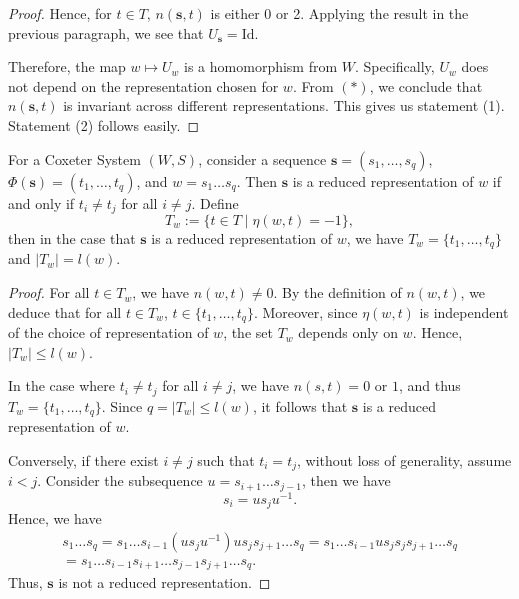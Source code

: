 \documentclass[../main.tex]{subfiles}
\begin{document}
\begin{lemma}
\begin{proof}
        Hence, for $t \in T$, $n(\mathbf{s}, t)$ is either 0 or 2. Applying the result in the previous paragraph, we see that $U_{\mathbf{s}} = \text{Id}$.

        Therefore, the map $w \mapsto U_w$ is a homomorphism from $W$. Specifically, $U_w$ does not depend on the representation chosen for $w$. From $(*)$, we conclude that $n(\mathbf{s}, t)$ is invariant across different representations. This gives us statement (1). Statement (2) follows easily.
    \end{proof}
\end{lemma}

\begin{theorem}
For a Coxeter System $(W,S)$, consider a sequence $\mathbf{s} = (s_1, \dots, s_q)$, $\Phi(\mathbf{s}) = (t_1, \dots, t_q)$, and $w = s_1 \dots s_q$. Then $\mathbf{s}$ is a reduced representation of $w$ if and only if $t_i \neq t_j$ for all $i \neq j$. Define
\[
T_w := \{ t \in T \mid \eta(w, t) = -1 \},
\]
then in the case that $\mathbf{s}$ is a reduced representation of $w$, we have $T_w = \{ t_1, \dots, t_q \}$ and $|T_w| = l(w)$.

    \begin{proof}
        For all $t \in T_w$, we have $n(w, t) \neq 0$. By the definition of $n(w, t)$, we deduce that for all $t \in T_w$, $t \in \{ t_1, \dots, t_q \}$. Moreover, since $\eta(w, t)$ is independent of the choice of representation of $w$, the set $T_w$ depends only on $w$. Hence, $|T_w| \leq l(w)$.

        In the case where $t_i \neq t_j$ for all $i \neq j$, we have $n(s, t) = 0$ or $1$, and thus $T_w = \{ t_1, \dots, t_q \}$. Since $q = |T_w| \leq l(w)$, it follows that $\mathbf{s}$ is a reduced representation of $w$.

        Conversely, if there exist $i \neq j$ such that $t_i = t_j$, without loss of generality, assume $i < j$. Consider the subsequence $u = s_{i+1} \dots s_{j-1}$, then we have
        \[
        s_i = u s_j u^{-1}.
        \]
        Hence, we have
        \begin{align*}
            s_1 \dots s_q = s_1 \dots s_{i-1} (u s_j u^{-1}) u s_j s_{j+1} \dots s_q = s_1 \dots s_{i-1} u s_j s_j s_{j+1} \dots s_q\\
            = s_1 \dots s_{i-1} s_{i+1} \dots s_{j-1} s_{j+1} \dots s_q.
        \end{align*}
        Thus, $\mathbf{s}$ is not a reduced representation.
    \end{proof}
\end{theorem}
\end{document}
